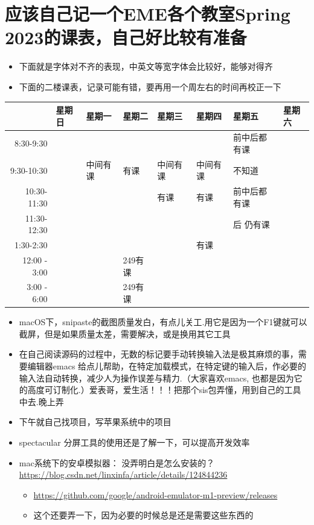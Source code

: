 \documentclass[9pt, b5paper]{article}
\begin{document}
\section{应该自己记一个EME各个教室Spring 2023的课表，自己好比较有准备}
\label{sec-7}
\begin{itemize}
\item 下面就是字体对不齐的表现，中英文等宽字体会比较好，能够对得齐
\item 下面的二楼课表，记录可能有错，要再用一个周左右的时间再校正一下
\end{itemize}
\begin{center}
\begin{tabular}{rlllllll}
\hline
 & 星期日 & 星期一 & 星期二 & 星期三 & 星期四 & 星期五 & 星期六\\
\hline
8:30-9:30 &  &  &  &  &  & 前中后都有课 & \\
9:30-10:30 &  & 中间有课 & 有课 & 中间有 课 & 中间有课 & 不知道 & \\
10:30-11:30 &  &  &  & 有课 & 有课 & 前中后都有课 & \\
11:30-12:30 &  &  &  &  &  & 后 仍有课 & \\
\hline
1:30-2:30 &  &  &  &  & 有课 &  & \\
12:00 - 3:00 &  &  & 249有课 &  &  &  & \\
3:00 - 6:00 &  &  & 249有课 &  &  &  & \\
\hline
\end{tabular}
\end{center}
\begin{itemize}
\item macOS下，snipaste的截图质量发白，有点儿关工.用它是因为一个F1键就可以截屏，但是如果质量太差，需要解决，或是换用其它工具
\item 在自己阅读源码的过程中，无数的标记要手动转换输入法是极其麻烦的事，需要编辑器emacs 给点儿帮助，在特定加载模式，在特定键的输入后，作必要的输入法自动转换，减少人为操作误差与精力.（大家喜欢emacs, 也都是因为它的高度可订制化.）爱表哥，爱生活！！！把那个sis包弄懂，用到自己的工具中去.晚上弄
\item 下午就自己找项目，写苹果系统中的项目
\item spectacular 分屏工具的使用还是了解一下，可以提高开发效率
\item mac系统下的安卓模拟器： 没弄明白是怎么安装的？\url{https://blog.csdn.net/linxinfa/article/details/124844236}
\begin{itemize}
\item \url{https://github.com/google/android-emulator-m1-preview/releases}
\item 这个还要弄一下，因为必要的时候总是还是需要这些东西的
\end{itemize}
\end{itemize}
\end{document}
